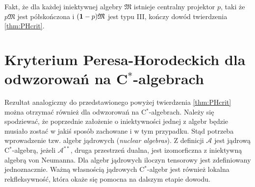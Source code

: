 Fakt, że dla każdej iniektywnej algebry $\mathfrak{M}$
istnieje centralny projektor $p$, taki że $p\mathfrak{M}$
jest półskończona i $({\bf 1}-p)\mathfrak{M}$ jest typu III,
kończy dowód twierdzenia \ref{thm:PHcrit}.


\section{Kryterium Peresa-Horodeckich dla odwzorowań na C$^*$-algebrach}
\label{sec:HorCstar}
Rezultat analogiczny do przedstawionego powyżej twierdzenia \ref{thm:PHcrit}
można otrzymać również dla odwzorowań na C$^*$-algebrach.
Należy się spodziewać, że poprzednie założenie o iniektywności jednej z
algebr będzie musiało zostać w jakiś sposób zachowane i w tym przypadku.
Stąd potrzeba wprowadzenie tzw. algebr jądrowych (\emph{nuclear algebras}).
Z definicji $\mathcal{A}$ jest jądrową C$^{*}$-algebrą,
jeżeli $\mathcal{A}^{**}$, druga przestrzeń dualna,
jest izomorficzna z iniektywną algebrą von Neumanna.
Dla algebr jądrowych iloczyn tensorowy jest zdefiniowany jednoznacznie.
Ważną własnością jądrowych C$^{*}$-algebr jest również lokalna rekfleksywność,
która okaże się pomocna na dalszym etapie dowodu.

